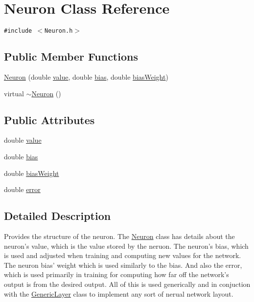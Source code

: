 \hypertarget{classNeuron}{
\section{Neuron Class Reference}
\label{classNeuron}
}
{\tt \#include $<$Neuron.h$>$}

\subsection*{Public Member Functions}
\begin{CompactItemize}
\item 
\hyperlink{classNeuron_c35024fa3eea9421afabdda2e59cd1aa}{Neuron} (double \hyperlink{classNeuron_e1988ffe53bfd53ce979aecf01a164e3}{value}, double \hyperlink{classNeuron_7dc59218069023c3b8348a353902b0ac}{bias}, double \hyperlink{classNeuron_27aa94b5d7658f718711cedb3f96dc7f}{bias\-Weight})
\item 
virtual \hyperlink{classNeuron_94a250ce7e167760e593979b899745b1}{$\sim$Neuron} ()
\end{CompactItemize}
\subsection*{Public Attributes}
\begin{CompactItemize}
\item 
double \hyperlink{classNeuron_e1988ffe53bfd53ce979aecf01a164e3}{value}
\item 
double \hyperlink{classNeuron_7dc59218069023c3b8348a353902b0ac}{bias}
\item 
double \hyperlink{classNeuron_27aa94b5d7658f718711cedb3f96dc7f}{bias\-Weight}
\item 
double \hyperlink{classNeuron_d4d851d9f4f5dccb6283e5c19726e1e7}{error}
\end{CompactItemize}


\subsection{Detailed Description}
Provides the structure of the neuron. The \hyperlink{classNeuron}{Neuron} class has details about the neuron's value, which is the value stored by the neruon. The neuron's bias, which is used and adjusted when training and computing new values for the network. The neuron bias' weight which is used similarly to the bias. And also the error, which is used primarily in training for computing how far off the network's output is from the desired output. All of this is used generically and in conjuction with the \hyperlink{classGenericLayer}{Generic\-Layer} class to implement any sort of nerual network layout. 



